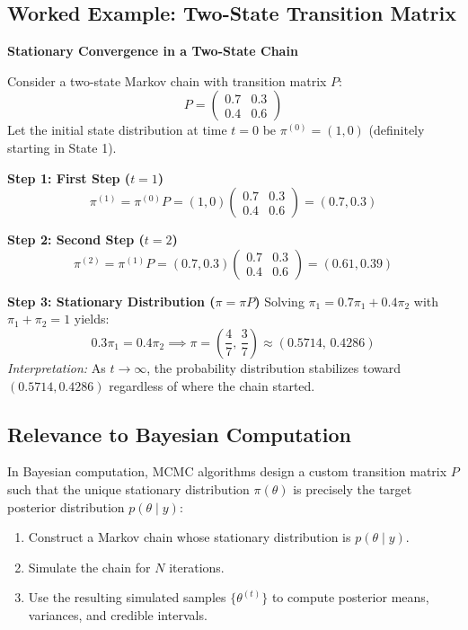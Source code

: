 \documentclass[12pt,a4paper]{article}
\begin{document}
\subsection{Worked Example: Two-State Transition Matrix}

\begin{example}
\textbf{Stationary Convergence in a Two-State Chain}

Consider a two-state Markov chain with transition matrix $P$:
\[
P = \begin{pmatrix} 0.7 & 0.3 \\ 0.4 & 0.6 \end{pmatrix}
\]
Let the initial state distribution at time $t=0$ be $\pi^{(0)} = (1, 0)$ (definitely starting in State 1).

\textbf{Step 1: First Step ($t=1$)}
\[
\pi^{(1)} = \pi^{(0)} P = (1, 0) \begin{pmatrix} 0.7 & 0.3 \\ 0.4 & 0.6 \end{pmatrix} = (0.7, 0.3)
\]

\textbf{Step 2: Second Step ($t=2$)}
\[
\pi^{(2)} = \pi^{(1)} P = (0.7, 0.3) \begin{pmatrix} 0.7 & 0.3 \\ 0.4 & 0.6 \end{pmatrix} = (0.61, 0.39)
\]

\textbf{Step 3: Stationary Distribution ($\pi = \pi P$)}
Solving $\pi_1 = 0.7 \pi_1 + 0.4 \pi_2$ with $\pi_1 + \pi_2 = 1$ yields:
\[
0.3 \pi_1 = 0.4 \pi_2 \implies \pi = \left(\frac{4}{7}, \, \frac{3}{7}\right) \approx (0.5714, \, 0.4286)
\]
\textit{Interpretation:} As $t \to \infty$, the probability distribution stabilizes toward $(0.5714, 0.4286)$ regardless of where the chain started.
\end{example}

\subsection{Relevance to Bayesian Computation}

In Bayesian computation, MCMC algorithms design a custom transition matrix $P$ such that the unique stationary distribution $\pi(\theta)$ is precisely the target posterior distribution $p(\theta \mid y)$:
\begin{enumerate}[leftmargin=1.5em]
    \item Construct a Markov chain whose stationary distribution is $p(\theta \mid y)$.
    \item Simulate the chain for $N$ iterations.
    \item Use the resulting simulated samples $\{\theta^{(t)}\}$ to compute posterior means, variances, and credible intervals.
\end{enumerate}
\end{document}
